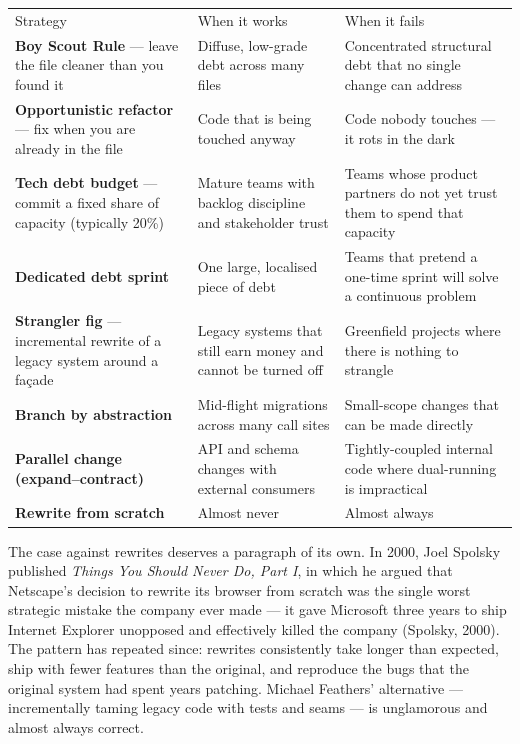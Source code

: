 \documentclass[11pt,a4paper]{book}
\begin{document}
\begin{tabular}{lll}
\hline
Strategy & When it works & When it fails \\
\textbf{Boy Scout Rule} --- leave the file cleaner than you found it & Diffuse, low-grade debt across many files & Concentrated structural debt that no single change can address \\
\textbf{Opportunistic refactor} --- fix when you are already in the file & Code that is being touched anyway & Code nobody touches --- it rots in the dark \\
\textbf{Tech debt budget} --- commit a fixed share of capacity (typically 20\%) & Mature teams with backlog discipline and stakeholder trust & Teams whose product partners do not yet trust them to spend that capacity \\
\textbf{Dedicated debt sprint} & One large, localised piece of debt & Teams that pretend a one-time sprint will solve a continuous problem \\
\textbf{Strangler fig} --- incremental rewrite of a legacy system around a façade & Legacy systems that still earn money and cannot be turned off & Greenfield projects where there is nothing to strangle \\
\textbf{Branch by abstraction} & Mid-flight migrations across many call sites & Small-scope changes that can be made directly \\
\textbf{Parallel change (expand--contract)} & API and schema changes with external consumers & Tightly-coupled internal code where dual-running is impractical \\
\textbf{Rewrite from scratch} & Almost never & Almost always \\
\hline
\end{tabular}

The case against rewrites deserves a paragraph of its own. In 2000, Joel Spolsky published \textit{Things You Should Never Do, Part I}, in which he argued that Netscape's decision to rewrite its browser from scratch was the single worst strategic mistake the company ever made --- it gave Microsoft three years to ship Internet Explorer unopposed and effectively killed the company (Spolsky, 2000). The pattern has repeated since: rewrites consistently take longer than expected, ship with fewer features than the original, and reproduce the bugs that the original system had spent years patching. Michael Feathers' alternative --- incrementally taming legacy code with tests and seams --- is unglamorous and almost always correct.
\end{document}
